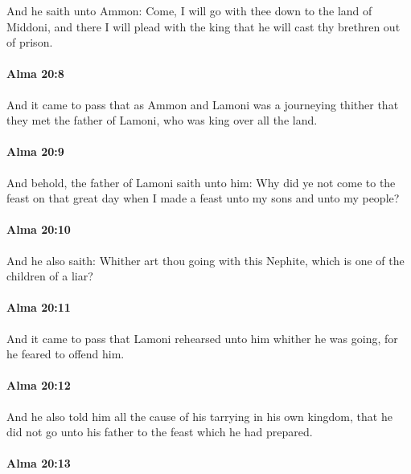 			And he saith unto Ammon:
			Come, I will go with thee down to the land of Middoni,
			and there I will plead with the king that he will cast thy brethren out of prison.

		\paragraph{Alma 20:8} %
			\label{ALMA-20-8}

			And it came to pass that as Ammon and Lamoni was a journeying thither
			that they met the father of Lamoni, who was king over all the land.

		\paragraph{Alma 20:9} %
			\label{ALMA-20-9}

			And behold, the father of Lamoni saith unto him:
			Why did ye not come to the feast on that great day
			when I made a feast unto my sons and unto my people?

		\paragraph{Alma 20:10} %
			\label{ALMA-20-10}

			And he also saith:
			Whither art thou going with this Nephite,
			which is one of the children of a liar?

		\paragraph{Alma 20:11} %
			\label{ALMA-20-11}

			And it came to pass that
			Lamoni rehearsed unto him whither he was going,
			for he feared to offend him.

		\paragraph{Alma 20:12} %
			\label{ALMA-20-12}

			And he also told him all the cause of his tarrying in his own kingdom,
			that he did not go unto his father to the feast which he had prepared.

		\paragraph{Alma 20:13} %
			\label{ALMA-20-13}

